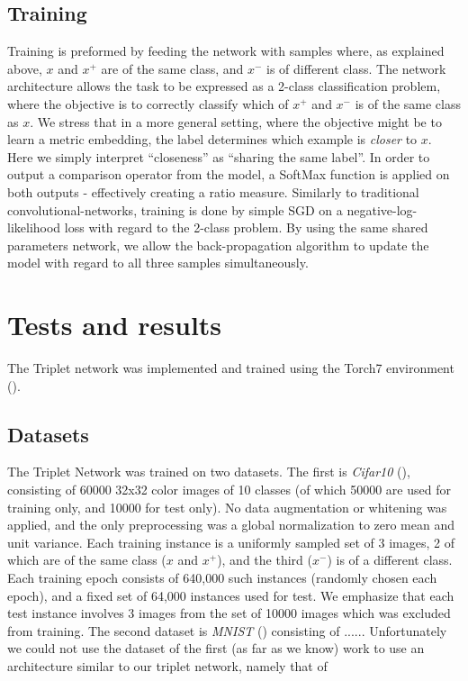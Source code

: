 \documentclass{article} %
\begin{document}
\subsection{Training}
Training is preformed by feeding the network with samples where, as explained above, $x$ and $x^{+}$ are of the same class, and $x^{-}$ is of different class.
The network architecture allows the task to be expressed as a 2-class classification problem, where the objective is to correctly classify  which of $x^+$ and $x^-$ is of the same class as $x$.
We stress that in a more general setting, where the objective might be to learn a metric embedding, 
the label determines which example is  \emph{closer} to $x$.
Here we simply interpret ``closeness'' as ``sharing the same label''.
In order to output a comparison operator from the model,
a SoftMax function is applied on both outputs - effectively creating a ratio measure.
Similarly to traditional convolutional-networks, training is done by simple SGD on a negative-log-likelihood loss with regard to the 2-class problem.
By using the same shared parameters network, we allow the back-propagation algorithm to update the model with regard to all three samples simultaneously.

\section{Tests and results}
 The Triplet network was implemented and trained using the Torch7 environment (\citet{collobert2011torch7}).
\subsection{Datasets}

The Triplet Network was trained on two datasets.  The first is \emph{Cifar10}  (\citet{krizhevsky2009learning}), consisting of 60000 32x32 color images of 10 classes (of which 50000 are used for training only, and 10000 for test only). No data augmentation or whitening was applied, and the only preprocessing was a global normalization to zero mean and unit variance.
Each training instance is a uniformly sampled set of 3 images, 2 of which are of the same class ($x$ and $x^{+}$), and the third ($x^{-}$) is of a different class. Each training epoch consists of 640,000 such instances (randomly chosen each epoch), and a fixed set of 64,000 instances used for test. We emphasize that each test instance involves 3 images from the set of 10000 images which was excluded from training.
The second dataset is \emph{MNIST} (\citet{???}) consisting of ......
Unfortunately we could not use the dataset of the first (as far as we know) work to use an architecture similar
to our triplet network, namely that of \cite{WangSLRWPCW2014}
\end{document}
